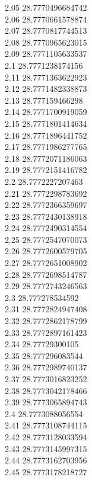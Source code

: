 {2.05	28.7770496684742\\
2.06	28.7770661578874\\
2.07	28.7770817744513\\
2.08	28.7770965623015\\
2.09	28.7771105633537\\
2.1	28.7771238174156\\
2.11	28.7771363622923\\
2.12	28.7771482338873\\
2.13	28.777159466298\\
2.14	28.7771700919059\\
2.15	28.7771801414634\\
2.16	28.7771896441752\\
2.17	28.7771986277765\\
2.18	28.7772071186063\\
2.19	28.7772151416782\\
2.2	28.7772227207463\\
2.21	28.7772298783692\\
2.22	28.7772366359697\\
2.23	28.7772430138918\\
2.24	28.7772490314554\\
2.25	28.7772547070073\\
2.26	28.7772600579705\\
2.27	28.7772651008902\\
2.28	28.7772698514787\\
2.29	28.7772743246563\\
2.3	28.777278534592\\
2.31	28.7772824947408\\
2.32	28.7772862178799\\
2.33	28.7772897161423\\
2.34	28.77729300105\\
2.35	28.777296083544\\
2.36	28.7772989740137\\
2.37	28.7773016823252\\
2.38	28.7773042178466\\
2.39	28.7773065894743\\
2.4	28.7773088056554\\
2.41	28.7773108744115\\
2.42	28.7773128033594\\
2.43	28.7773145997315\\
2.44	28.7773162703956\\
2.45	28.7773178218727\\
}
